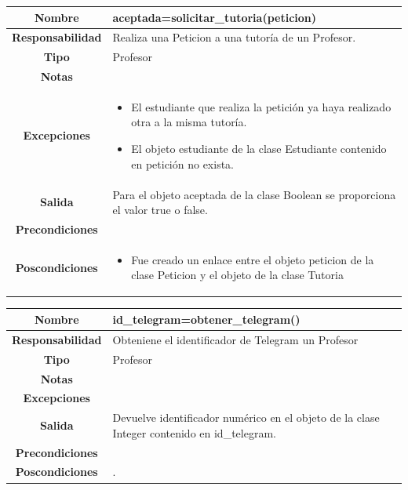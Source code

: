  
                       \begin{table}[!ht]
\begin{tabular}{|c|m{10cm}|}
\hline\rowcolor{Gray}
{\bf Nombre } & {aceptada=solicitar\_tutoria(peticion)}\\
\hline
{\bf Responsabilidad } & {Realiza una Peticion a una tutoría de un Profesor.}\\
\hline
\rowcolor{Gray}
{\bf Tipo } & {Profesor} \\
\hline
{\bf Notas } & { } \\
\hline
\rowcolor{Gray}
{\bf Excepciones }& {
	  \begin{itemize}
	  \item El estudiante que realiza la petición ya haya realizado otra a la misma tutoría.
	  \item El objeto estudiante de la clase Estudiante contenido en petición no exista.
	  \end{itemize}
} \\
\hline
{\bf Salida }& 
	  { 	
	  Para el objeto aceptada de  la clase Boolean se proporciona el valor true o false.
	  } 
 \\
\hline
\rowcolor{Gray}
{\bf Precondiciones }& {}\\
\hline
{\bf Poscondiciones }& {
\begin{itemize}
\item Fue creado un enlace entre el objeto peticion de la clase Peticion y el objeto de la clase Tutoria
\end{itemize}}
  \\
\hline
\end{tabular}

\end{table}


                       \begin{table}[!ht]
\begin{tabular}{|c|m{10cm}|}
\hline\rowcolor{Gray}
{\bf Nombre } & {id\_telegram=obtener\_telegram()}\\
\hline
{\bf Responsabilidad } & {Obteniene el identificador de Telegram un Profesor}\\
\hline
\rowcolor{Gray}
{\bf Tipo } & {Profesor} \\
\hline
{\bf Notas } & { } \\
\hline
\rowcolor{Gray}
{\bf Excepciones }& {
} \\
\hline
{\bf Salida }& 
	  { 	
	  Devuelve identificador numérico en el objeto de la clase Integer contenido en id\_telegram.
	  } 
 \\
\hline
\rowcolor{Gray}
{\bf Precondiciones }& {}\\
\hline
{\bf Poscondiciones }& {}.
  \\
\hline
\end{tabular}

\end{table}



